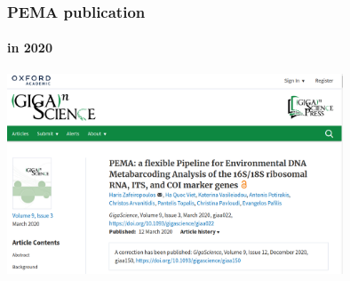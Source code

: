 \documentclass{beamer}
\begin{document}
   \begin{frame}
      \frametitle{PEMA publication}
      \framesubtitle{in 2020}
      \includegraphics[width=100mm]{resources/pema_publ.png}
   \end{frame}
   \fi 
\end{document}
